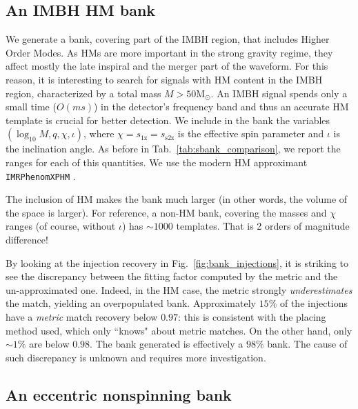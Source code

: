 \documentclass[twocolumn,showpacs,preprintnumbers,nofootinbib,prd,
superscriptaddress,10pt]{revtex4-2}
\begin{document}
\subsection{An IMBH HM bank}\label{sec:HM_bank}

We generate a bank, covering part of the IMBH region, that includes Higher Order Modes. As HMs are more important in the strong gravity regime, they affect mostly the late inspiral and the merger part of the waveform.
For this reason, it is interesting to search for signals with HM content in the IMBH region, characterized by a total mass $M>50 \mathrm{M_\odot}$. An IMBH signal spends only a small time ($O(ms)$) in the detector's frequency band and thus an accurate HM template is crucial for better detection.
We include in the bank the variables $\left( \log_{10} M, q, \chi, \iota \right)$, where $\chi=s_\text{1z}=s_\text{s2z}$ is the effective spin parameter and $\iota$ is the inclination angle.
As before in Tab.~\ref{tab:sbank_comparison}, we report the ranges for each of this quantities. We use the modern HM approximant \texttt{IMRPhenomXPHM} \cite{Pratten:2020ceb}.

The inclusion of HM makes the bank much larger (in other words, the volume of the space is larger). For reference, a non-HM bank, covering the masses and $\chi$ ranges (of course, without $\iota$) has $\sim 1000$ templates. That is 2 orders of magnitude difference!

By looking at the injection recovery in Fig.~\ref{fig:bank_injections}, it is striking to see the discrepancy between the fitting factor computed by the metric and the un-approximated one. Indeed, in the HM case, the metric strongly {\it underestimates} the match, yielding an overpopulated bank. Approximately $15\%$ of the injections have a {\it metric} match recovery below $0.97$: this is consistent with the placing method used, which only ``knows" about metric matches. On the other hand, only $\sim 1\%$ are below $0.98$. The bank generated is effectively a $98\%$ bank.
The cause of such discrepancy is unknown and requires more investigation.

\subsection{An eccentric nonspinning bank}\label{sec:eccentric_bank}
\end{document}
